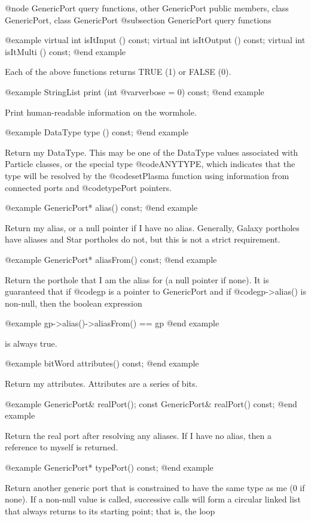 @node GenericPort query functions, other GenericPort public members, class GenericPort, class GenericPort
@subsection GenericPort query functions

@example
virtual int isItInput () const;
virtual int isItOutput () const;
virtual int isItMulti () const;
@end example

Each of the above functions returns TRUE (1) or FALSE (0).

@example
StringList print (int @var{verbose} = 0) const;
@end example

Print human-readable information on the wormhole.

@example
DataType type () const;
@end example

Return my DataType.  This may be one of the DataType values associated
with Particle classes, or the special type @code{ANYTYPE}, which
indicates that the type will be resolved by the @code{setPlasma}
function using information from connected ports and @code{typePort} pointers.

@example
GenericPort* alias() const;
@end example

Return my alias, or a null pointer if I have no alias.  Generally,
Galaxy portholes have aliases and Star portholes do not, but this
is not a strict requirement.

@example
GenericPort* aliasFrom() const;
@end example

Return the porthole that I am the alias for (a null pointer if none).
It is guaranteed that if @code{gp} is a pointer to GenericPort and if
@code{gp->alias()} is non-null, then the boolean expression

@example
gp->alias()->aliasFrom() == gp
@end example

is always true.

@example
bitWord attributes() const;
@end example

Return my attributes.  Attributes are a series of bits.

@example
GenericPort& realPort();
const GenericPort& realPort() const;
@end example

Return the real port after resolving any aliases.  If I have no alias,
then a reference to myself is returned.

@example
GenericPort* typePort() const;
@end example

Return another generic port that is constrained to have the same type as
me (0 if none).  If a non-null value is called, successive calls will
form a circular linked list that always returns to its starting point;
that is, the loop

